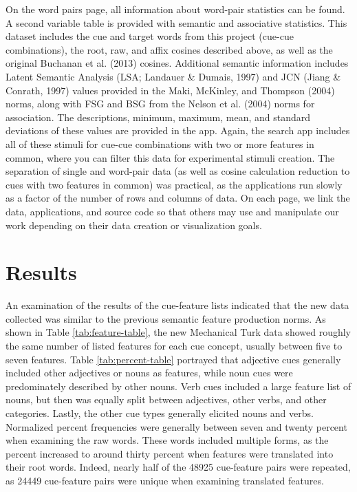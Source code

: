 \documentclass[english,man]{apa6}
\theoremstyle{definition}
\theoremstyle{definition}
\theoremstyle{definition}
\theoremstyle{remark}
\begin{document}
On the word pairs page, all information about word-pair statistics can
be found. A second variable table is provided with semantic and
associative statistics. This dataset includes the cue and target words
from this project (cue-cue combinations), the root, raw, and affix
cosines described above, as well as the original Buchanan et al. (2013)
cosines. Additional semantic information includes Latent Semantic
Analysis (LSA; Landauer \& Dumais, 1997) and JCN (Jiang \& Conrath,
1997) values provided in the Maki, McKinley, and Thompson (2004) norms,
along with FSG and BSG from the Nelson et al. (2004) norms for
association. The descriptions, minimum, maximum, mean, and standard
deviations of these values are provided in the app. Again, the search
app includes all of these stimuli for cue-cue combinations with two or
more features in common, where you can filter this data for experimental
stimuli creation. The separation of single and word-pair data (as well
as cosine calculation reduction to cues with two features in common) was
practical, as the applications run slowly as a factor of the number of
rows and columns of data. On each page, we link the data, applications,
and source code so that others may use and manipulate our work depending
on their data creation or visualization goals.

\section{Results}\label{results}

An examination of the results of the cue-feature lists indicated that
the new data collected was similar to the previous semantic feature
production norms. As shown in Table \ref{tab:feature-table}, the new
Mechanical Turk data showed roughly the same number of listed features
for each cue concept, usually between five to seven features. Table
\ref{tab:percent-table} portrayed that adjective cues generally included
other adjectives or nouns as features, while noun cues were
predominately described by other nouns. Verb cues included a large
feature list of nouns, but then was equally split between adjectives,
other verbs, and other categories. Lastly, the other cue types generally
elicited nouns and verbs. Normalized percent frequencies were generally
between seven and twenty percent when examining the raw words. These
words included multiple forms, as the percent increased to around thirty
percent when features were translated into their root words. Indeed,
nearly half of the 48925 cue-feature pairs were repeated, as 24449
cue-feature pairs were unique when examining translated features.
\end{document}

